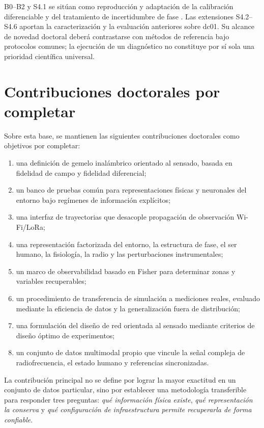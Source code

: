 B0--B2 y S4.1 se sitúan como reproducción y adaptación de la calibración
diferenciable y del tratamiento de incertidumbre de fase
\citep{Hoydis2024DiffRT,Ruah2024Phase}. Las extensiones S4.2--S4.6 aportan
la caracterización y la evaluación anteriores sobre dc01. Su alcance de
novedad doctoral deberá contrastarse con métodos de referencia bajo protocolos
comunes; la ejecución de un diagnóstico no constituye por sí sola una
prioridad científica universal.

\section{Contribuciones doctorales por completar}

Sobre esta base, se mantienen las siguientes contribuciones doctorales como objetivos por completar:
\begin{enumerate}
\item una definición de gemelo inalámbrico orientado al sensado, basada en fidelidad de campo y fidelidad diferencial;
\item un banco de pruebas común para representaciones físicas y neuronales del entorno bajo regímenes de información explícitos;
\item una interfaz de trayectorias que desacople propagación de observación Wi-Fi/LoRa;
\item una representación factorizada del entorno, la estructura de fase, el ser humano, la fisiología, la radio y las perturbaciones instrumentales;
\item un marco de observabilidad basado en Fisher para determinar zonas y variables recuperables;
\item un procedimiento de transferencia de simulación a mediciones reales, evaluado mediante la eficiencia de datos y la generalización fuera de distribución;
\item una formulación del diseño de red orientada al sensado mediante criterios de diseño óptimo de experimentos;
\item un conjunto de datos multimodal propio que vincule la señal compleja de radiofrecuencia, el estado humano y referencias sincronizadas.
\end{enumerate}

La contribución principal no se define por lograr la mayor exactitud en un conjunto de datos particular, sino por establecer una metodología transferible para responder tres preguntas: \textit{qué información física existe}, \textit{qué representación la conserva} y \textit{qué configuración de infraestructura permite recuperarla de forma confiable}.

